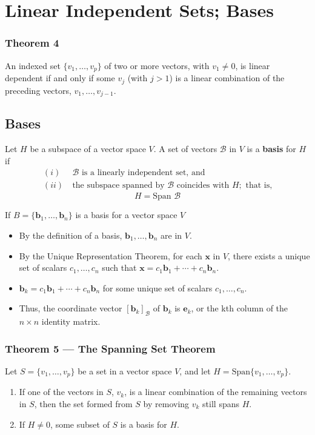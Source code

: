 \documentclass{article}
\begin{document}
\section*{Linear Independent Sets; Bases}

\subsubsection*{Theorem 4}
An indexed set $\{v_1, \ldots, v_p\}$ of two or more vectors, with $v_1 \neq 0$, is linear
dependent if and only if some $v_j$ (with $j > 1$) is a linear combination of the preceding
vectors, $v_1, \ldots, v_{j-1}$.

\subsection*{Bases}
Let $H$ be a subspace of a vector space $V$. A set of vectors $\mathcal{B}$ in $V$ is a
\textbf{basis} for $H$ if
\begin{align*}
    (i) & \ \mathcal{B} \text{ is a linearly independent set, and} \\
    (ii) & \ \text{the subspace spanned by } \mathcal{B} \text{ coincides with } H;
    \text{ that is,}
\end{align*}
\[H = \text{Span } \mathcal{B}\]

If $B=\{\mathbf{b}_1, \ldots, \mathbf{b}_n\}$ is a basis for a vector space $V$
\begin{itemize}
    \item By the definition of a basis, $\mathbf{b}_1, \ldots, \mathbf{b}_n$ are in $V$.
    \item By the Unique Representation Theorem, for each $\mathbf{x}$ in $V$, there exists a unique set of scalars $c_1, \ldots, c_n$ such that $\mathbf{x}=c_1\mathbf{b}_1 + \cdots + c_n\mathbf{b}_n$.
    \item $\mathbf{b}_k=c_1\mathbf{b}_1 + \cdots + c_n\mathbf{b}_n$ for some unique set of scalars $c_1, \ldots, c_n$.
    \item Thus, the coordinate vector ${[\mathbf{b}_k]}_\mathcal{B}$ of $\mathbf{b}_k$ is $\mathbf{e}_k$, or the kth column of the $n\times n$ identity matrix.
\end{itemize}

\subsubsection*{Theorem 5 --- The Spanning Set Theorem}
Let $S=\{v_1, \ldots, v_p\}$ be a set in a vector space $V$, and let
$H=\text{Span}\{v_1, \ldots, v_p\}$.
\begin{enumerate}
    \item If one of the vectors in $S$, $v_k$, is a linear combination of the remaining vectors in
    $S$, then the set formed from $S$ by removing $v_k$ still spans $H$.
    \item If $H\neq {0}$, some subset of $S$ is a basis for $H$.
\end{enumerate}
\end{document}
